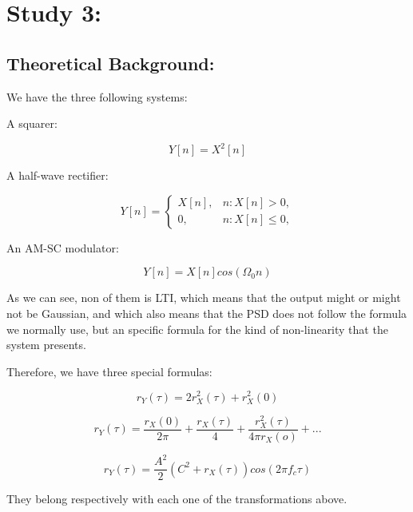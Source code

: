 \documentclass[a4paper,11pt]{article}
\begin{document}
\newpage

\section{Study 3:}

\subsection{Theoretical Background:}

We have the three following systems:

A squarer:

\begin{equation}
  Y[n] =X^2[n]
\end{equation}

A half-wave rectifier:

\begin{equation}
  Y[n] =
    \begin{cases}
        X[n],& n: X[n]>0,\\
        0,    & n: X[n] \leq 0,
    \end{cases}
\end{equation}

An AM-SC modulator:

\begin{equation}
  Y[n] =X[n]cos(\Omega_{0} n)
\end{equation}

As we can see, non of them is LTI, which means that the output might or might not be Gaussian, and which also means that the PSD does not follow the formula we normally use, but an specific formula for the kind of non-linearity that the system presents.

Therefore, we have three special formulas:

\begin{equation}
  r_Y(\tau) = 2r_X^2(\tau) + r_X^2(0)
\end{equation}

\begin{equation}
  r_Y(\tau) = \frac{r_X(0)}{2\pi} + \frac{r_X(\tau)}{4} + \frac{r_X^2(\tau)}{4\pi r_X(o)} + ...
\end{equation}

\begin{equation}
  r_Y(\tau) = \frac{A^2}{2}(C^2 + r_X(\tau))cos(2\pi f_c \tau)
\end{equation}

They belong respectively with each one of the transformations above.
\end{document}
